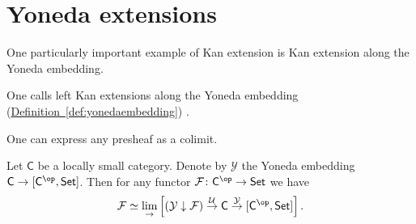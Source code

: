 \documentclass[notes.tex]{subfiles}
\begin{document}
\section{Yoneda extensions}
\label{sec:yoneda_extensions}

One particularly important example of Kan extension is Kan extension along the Yoneda embedding.

\begin{definition}
  \label{def:yoneda_extension}
  One calls left Kan extensions along the Yoneda embedding (\hyperref[def:yonedaembedding]{Definition~\ref*{def:yonedaembedding}}) .
\end{definition}

One can express any presheaf as a colimit.

\begin{lemma}
  \label{lemma:colimit_of_comma_category}
  Let $\mathsf{C}$ be a locally small category. Denote by $\mathcal{Y}$ the Yoneda embedding $\mathsf{C} \to [\mathsf{C}^{\op}, \mathsf{Set}]$. Then for any functor $\mathcal{F}\colon \mathsf{C}^{\op} \to \mathsf{Set}$ we have
  \begin{equation*}
    \mathcal{F} \simeq \lim_{\rightarrow} \left[ (\mathcal{Y} \downarrow \mathcal{F}) \overset{\mathcal{U}}{\to} \mathsf{C} \overset{\mathcal{Y}}{\to} [\mathsf{C}^{\op}, \mathsf{Set}] \right].
  \end{equation*}
\end{lemma}
\end{document}

